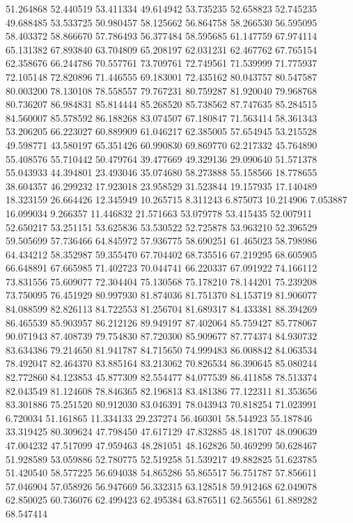 51.264868
52.440519
53.411334
49.614942
53.735235
52.658823
52.745235
49.688485
53.533725
50.980457
58.125662
56.864758
58.266530
56.595095
58.403372
58.866670
57.786493
56.377484
58.595685
61.147759
67.974114
65.131382
67.893840
63.704809
65.208197
62.031231
62.467762
67.765154
62.358676
66.244786
70.557761
73.709761
72.749561
71.539999
71.775937
72.105148
72.820896
71.446555
69.183001
72.435162
80.043757
80.547587
80.003200
78.130108
78.558557
79.767231
80.759287
81.920040
79.968768
80.736207
86.984831
85.814444
85.268520
85.738562
87.747635
85.284515
84.560007
85.578592
86.188268
83.074507
67.180847
71.563414
58.361343
53.206205
66.223027
60.889909
61.046217
62.385005
57.654945
53.215528
49.598771
43.580197
65.351426
60.990830
69.869770
62.217332
45.764890
55.408576
55.710442
50.479764
39.477669
49.329136
29.090640
51.571378
55.043933
44.394801
23.493046
35.074680
58.273888
55.158566
18.778655
38.604357
46.299232
17.923018
23.958529
31.523844
19.157935
17.140489
18.323159
26.664426
12.345949
10.265715
8.311243
6.875073
10.214906
7.053887
16.099034
9.266357
11.446832
21.571663
53.079778
53.415435
52.007911
52.650217
53.251151
53.625836
53.530522
52.725878
53.963210
52.396529
59.505699
57.736466
64.845972
57.936775
58.690251
61.465023
58.798986
64.434212
58.352987
59.355470
67.704402
68.735516
67.219295
68.605905
66.648891
67.665985
71.402723
70.044741
66.220337
67.091922
74.166112
73.831556
75.609077
72.304404
75.130568
75.178210
78.144201
75.239208
73.750095
76.451929
80.997930
81.874036
81.751370
84.153719
81.906077
84.088599
82.826113
84.722553
81.256704
81.689317
84.433381
88.394269
86.465539
85.903957
86.212126
89.949197
87.402064
85.759427
85.778067
90.071943
87.408739
79.754830
87.720300
85.909677
87.774374
84.930732
83.634386
79.214650
81.941787
84.715650
74.999483
86.008842
84.063534
78.492047
82.464370
83.885164
83.213062
70.826534
86.390645
85.080244
82.772860
84.123853
45.877309
82.554477
84.077539
86.411858
78.513374
82.043549
81.124608
78.846365
82.196813
83.481386
77.122311
81.353656
83.301886
75.251520
80.912030
83.046391
78.043943
70.818254
71.023991
6.720034
51.161865
11.334133
29.237274
56.460301
58.544923
55.187846
33.319425
80.309624
47.798450
47.617129
47.832885
48.181707
48.090639
47.004232
47.517099
47.959463
48.281051
48.162826
50.469299
50.628467
51.928589
53.059886
52.780775
52.519258
51.539217
49.882825
51.623785
51.420540
58.577225
56.694038
54.865286
55.865517
56.751787
57.856611
57.046904
57.058926
56.947669
56.332315
63.128518
59.912468
62.049078
62.850025
60.736076
62.499423
62.495384
63.876511
62.565561
61.889282
68.547414
